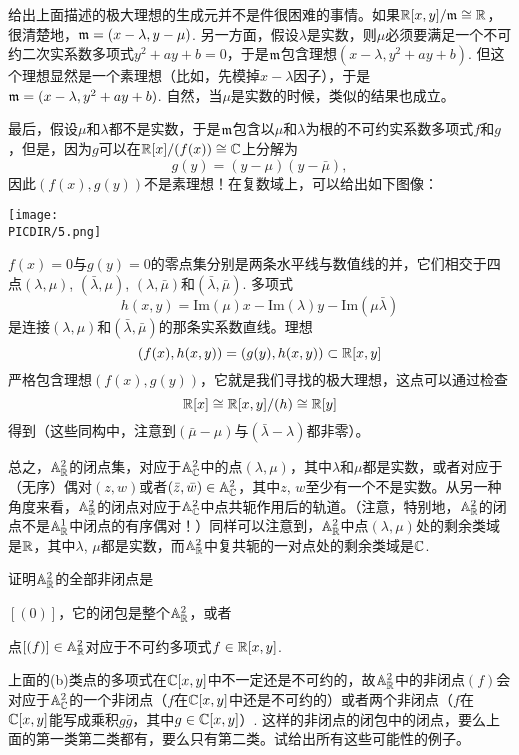 给出上面描述的极大理想的生成元并不是件很困难的事情。如果$\mathbb{R}[x,y]/\mathfrak{m}\cong \mathbb{R} $，很清楚地，$\mathfrak{m}=(x-\lambda,y-\mu)$. 另一方面，假设$\lambda$是实数，则$\mu$必须要满足一个不可约二次实系数多项式$y^2+ay+b=0$，于是$\mathfrak{m}$包含理想$(x-\lambda,y^2+ay+b)$. 但这个理想显然是一个素理想（比如，先模掉$x-\lambda$因子），于是$\mathfrak{m}=(x-\lambda,y^2+ay+b)$. 自然，当$\mu$是实数的时候，类似的结果也成立。

最后，假设$\mu$和$\lambda$都不是实数，于是$\mathfrak{m}$包含以$\mu$和$\lambda$为根的不可约实系数多项式$f$和$g$，但是，因为$g$可以在$\mathbb{R}[x]/(f(x))\cong \mathbb{C}$上分解为
\[
	g(y)=(y-\mu)(y-\bar\mu),
\]
因此$(f(x),g(y))$不是素理想！在复数域上，可以给出如下图像：

\begin{center}\texttt{[image: \\PICDIR/5.png]}\end{center}

$f(x)=0$与$g(y)=0$的零点集分别是两条水平线与数值线的并，它们相交于四点$(\lambda,\mu)$, $(\bar\lambda,\mu)$, $(\lambda,\bar\mu)$和$(\bar\lambda,\bar\mu)$. 多项式
\[
	h(x,y)=\mathrm{Im}(\mu) x - \mathrm{Im}(\lambda)  y -\mathrm{Im}(\mu\bar\lambda)
\]
是连接$(\lambda,\mu)$和$(\bar\lambda,\bar\mu)$的那条实系数直线。理想
\[
	(f(x),h(x,y))=(g(y),h(x,y))\subset \mathbb{R}[x,y]
\]
严格包含理想$(f(x),g(y))$，它就是我们寻找的极大理想，这点可以通过检查
\[
	\mathbb{R}[x]\cong \mathbb{R}[x,y]/(h)\cong \mathbb{R}[y]
\]
得到（这些同构中，注意到$(\bar\mu-\mu)$与$(\bar\lambda-\lambda)$都非零）。

总之，$\mathbb{A}_{\mathbb{R}}^2$的闭点集，对应于$\mathbb{A}_{\mathbb{C}}^2$中的点$(\lambda,\mu)$，其中$\lambda$和$\mu$都是实数，或者对应于（无序）偶对$(z,w)$或者$(\bar z,\bar w)\in \mathbb{A}_{\mathbb{C}}^2$，其中$z$, $w$至少有一个不是实数。从另一种角度来看，$\mathbb{A}_{\mathbb{R}}^2$的闭点对应于$\mathbb{A}_{\mathbb{C}}^2$中点共轭作用后的轨道。（注意，特别地，$\mathbb{A}_{\mathbb{R}}^2$的闭点不是$\mathbb{A}_{\mathbb{R}}^1$中闭点的有序偶对！）同样可以注意到，$\mathbb{A}_{\mathbb{R}}^2$中点$(\lambda,\mu)$处的剩余类域是$\mathbb{R}$，其中$\lambda$, $\mu$都是实数，而$\mathbb{A}_{\mathbb{R}}^2$中复共轭的一对点处的剩余类域是$\mathbb{C}$.

\begin{exe}
	证明$\mathbb{A}^2_{\mathbb{R}}$的全部非闭点是
	\begin{compactenum}[(a)]
		\item $[(0)]$，它的闭包是整个$\mathbb{A}^2_{\mathbb{R}}$，或者
		\item 点$[(f)]\in \mathbb{A}^2_{\mathbb{R}}$对应于不可约多项式$f\in \mathbb{R}[x,y]$.
	\end{compactenum}

	上面的(b)类点的多项式在$\mathbb{C}[x,y]$中不一定还是不可约的，故$\mathbb{A}^2_{\mathbb{R}}$中的非闭点$(f)$会对应于$\mathbb{A}^2_{\mathbb{C}}$的一个非闭点（$f$在$\mathbb{C}[x,y]$中还是不可约的）或者两个非闭点（$f$在$\mathbb{C}[x,y]$能写成乘积$g\bar g$，其中$g\in\mathbb{C}[x,y]$）. 这样的非闭点的闭包中的闭点，要么上面的第一类第二类都有，要么只有第二类。试给出所有这些可能性的例子。
\end{exe}

